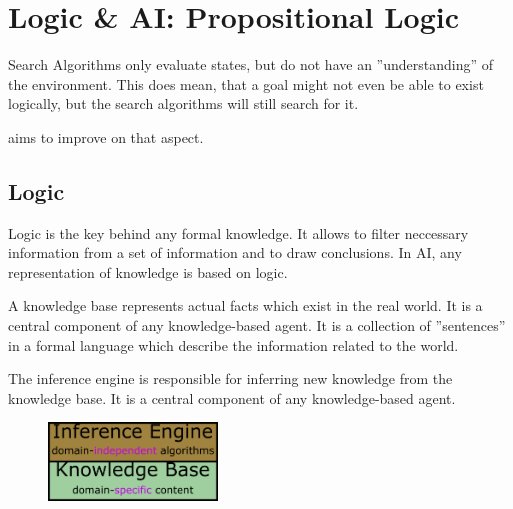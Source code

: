 \documentclass[
../../EiKI_Summary.tex,
]
{subfiles}
\begin{document}
\section{Logic \& AI: Propositional Logic}
Search Algorithms only evaluate states, but do not have an ''understanding'' of the environment. This does mean, that a goal might not even be able to exist logically, but the search algorithms will still search for it.

 aims to improve on that aspect.

\subsection{Logic}
Logic is the key behind any formal knowledge. It allows to filter neccessary information from a set of information and to draw conclusions. In AI, any representation of knowledge is based on logic.

\begin{defbox}
    A knowledge base represents actual facts which exist in the real world. It is a central component of any knowledge-based agent. It is a collection of ''sentences'' in a formal language which describe the information related to the world.
\end{defbox}

\begin{defbox}
    The inference engine is responsible for inferring new knowledge from the knowledge base. It is a central component of any knowledge-based agent.
\end{defbox}

\begin{figure}
    [H]
    \centering
    \includegraphics[width=0.4\textwidth]{Pics/06/Knowledge_Inference.png}
\end{figure}
\end{document}
